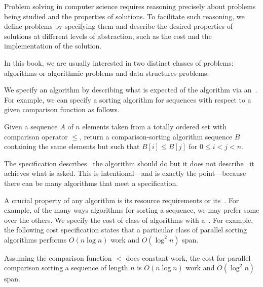 \begin{gram}
Problem solving in computer science requires reasoning precisely about
problems being studied and the properties of solutions.
%
To facilitate such reasoning,  we define problems by
specifying them and describe the desired properties of solutions at
different levels of abstraction, such as the cost and the
implementation  of the solution.

In this book, we are usually interested in two distinct classes of
problems: algorithms or algorithmic problems and data structures
problems.
\end{gram}

\begin{gram}
We specify an algorithm by describing what is expected of the
algorithm via an~.
%
For example, we can specify a sorting algorithm for sequences with
respect to a given comparison function as follows.
\end{gram}

\begin{definition}
Given a sequence $A$ of $n$ elements taken from a totally ordered set
with comparison operator $\leq$, return a comparison-sorting algorithm
sequence $B$ containing the same elements but such that $B[i] \leq
B[j]$ for $0 \leq i < j < n$.
\end{definition}

\begin{note}
The specification describes~ the algorithm should do but it
does not describe~ it achieves what is asked.
%
This is intentional---and is exactly the point---because there can be
many algorithms that meet a specification.
%
\end{note}

\begin{gram}
A crucial property of any algorithm is its resource requirements or
its~.
%
For example, of the many ways algorithms for sorting a sequence, we
may prefer some over the others.  
%
We specify the cost of class of algorithms with a~.  For example, the following cost specification
states that a particular class of parallel sorting algorithms performs
$O(n \log{n})$ work and $O(\log^2{n})$ span.
\end{gram}

\begin{costspec}
Assuming the comparison function $<$ does constant work, the cost for
parallel comparison sorting a sequence of length $n$ is $O(n \log n)$
work and $O(\log^2 n)$ span.
\end{costspec}

